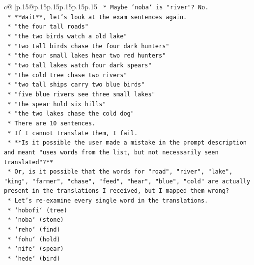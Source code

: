 \documentclass{article}
\begin{document}
{\begin{supertabular}{c@{$\;$}|p{.15\linewidth}@{}p{.15\linewidth}p{.15\linewidth}p{.15\linewidth}p{.15\linewidth}p{.15\linewidth}}
{{{\texttt{                *   Maybe `noba` is "river"? No.} \\
\texttt{            *   **Wait**, let's look at the exam sentences again.} \\
\texttt{                *   "the four tall roads"} \\
\texttt{                *   "the two birds watch a old lake"} \\
\texttt{                *   "two tall birds chase the four dark hunters"} \\
\texttt{                *   "the four small lakes hear two red hunters"} \\
\texttt{                *   "two tall lakes watch four dark spears"} \\
\texttt{                *   "the cold tree chase two rivers"} \\
\texttt{                *   "two tall ships carry two blue birds"} \\
\texttt{                *   "five blue rivers see three small lakes"} \\
\texttt{                *   "the spear hold six hills"} \\
\texttt{                *   "the two lakes chase the cold dog"} \\
\texttt{            *   There are 10 sentences.} \\
\texttt{            *   If I cannot translate them, I fail.} \\
\texttt{            *   **Is it possible the user made a mistake in the prompt description and meant "uses words from the list, but not necessarily seen translated"?**} \\
\texttt{            *   Or, is it possible that the words for "road", "river", "lake", "king", "farmer", "chase", "feed", "hear", "blue", "cold" are actually present in the translations I received, but I mapped them wrong?} \\
\texttt{            *   Let's re{-}examine every single word in the translations.} \\
\texttt{                *   `hobofi` (tree)} \\
\texttt{                *   `noba` (stone)} \\
\texttt{                *   `reho` (find)} \\
\texttt{                *   `fohu` (hold)} \\
\texttt{                *   `nife` (spear)} \\
\texttt{                *   `hede` (bird)} \\
}}}
\end{supertabular}}
\end{document}
